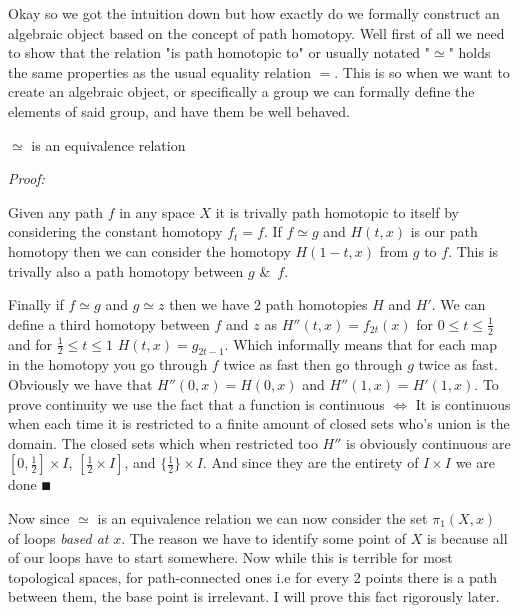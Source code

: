\documentclass[paper=a4,fontsize=paper,12.5pt]{book}
\newcommand{\3}{\vspace*{3mm}}
\newcommand{\Proof}{\textit{Proof:}}
\newcommand{\IFF}{$\Longleftrightarrow$ \hspace*{.5mm}}
\begin{document}
\3

Okay so we got the intuition down but how exactly do we formally construct an algebraic object based on the concept of path homotopy. Well first of all we need to show that the relation "is path homotopic to" or usually notated "$\simeq$" holds the same properties as the usual equality relation $=$. This is so when we want to create an algebraic object, or specifically a group we can formally define the elements of said group, and have them be well behaved.

\3

\begin{lemma}

$\simeq$ is an equivalence relation




\end{lemma}

\Proof


Given any path $f$ in any space $X$ it is trivally path homotopic to itself by considering the constant homotopy ${f}_{t} = f$. If $f \simeq g$ and $H(t,x)$ is our path homotopy then we can consider the homotopy $H(1-t,x)$ from $g$ to $f$. This is trivally also a path homotopy between $g$ \&\ $f$.

\3

Finally if $f \simeq g$ and $g \simeq z$ then we have $2$ path homotopies $H$ and $H'$. We can define a third homotopy between $f$ and $z$ as $H''(t,x) = {f}_{2t}(x) $ for $0 \leq t \leq \frac{1}{2}$ and for $\frac{1}{2} \leq t \leq 1$ $H(t,x) = {g}_{2t - 1}$. Which informally means that for each map in the homotopy you go through $f$ twice as fast then go through $g$ twice as fast. Obviously we have that $H''(0,x) = H(0,x)$ and $H''(1,x) = H'(1,x)$. To prove continuity we use the fact that a function is continuous \IFF It is continuous when each time it is restricted to a finite amount of closed sets who's union is the domain. The closed sets which when restricted too $H''$ is obviously continuous are $[0,\frac{1}{2}] \times I$, $[\frac{1}{2} \times I]$, and $\{\frac{1}{2}\} \times I$. And since they are the entirety of $I \times I$ we are done $\QED$

\3

Now since $\simeq$ is an equivalence relation we can now consider the set ${\pi}_{1}(X,{x})$ of loops \textit{based at} $x$. The reason we have to identify some point of $X$ is because all of our loops have to start somewhere. Now while this is terrible for most topological spaces, for path-connected ones i.e for every $2$ points there is a path between them, the base point is irrelevant. I will prove this fact rigorously later.
\end{document}
